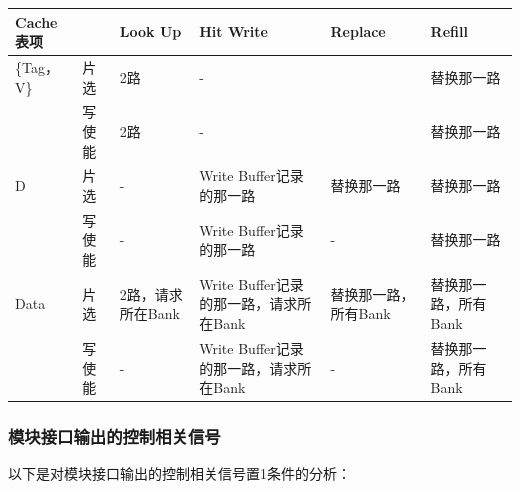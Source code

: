 \begin{longtable}[]{@{}
  >{\raggedright\arraybackslash}p{}
  >{\raggedright\arraybackslash}p{}
  >{\raggedright\arraybackslash}p{}
  >{\raggedright\arraybackslash}p{}
  >{\raggedright\arraybackslash}p{}
  >{\raggedright\arraybackslash}p{}@{}}
\toprule\noalign{}
\begin{minipage}[b]{\linewidth}\raggedright
Cache表项
\end{minipage} & \begin{minipage}[b]{\linewidth}\raggedright
\end{minipage} & \begin{minipage}[b]{\linewidth}\raggedright
Look Up
\end{minipage} & \begin{minipage}[b]{\linewidth}\raggedright
Hit Write
\end{minipage} & \begin{minipage}[b]{\linewidth}\raggedright
Replace
\end{minipage} & \begin{minipage}[b]{\linewidth}\raggedright
Refill
\end{minipage} \\
\midrule\noalign{}
\endhead
\bottomrule\noalign{}
\endlastfoot
\{Tag，V\} & 片选 & 2路 & - & & 替换那一路 \\
& 写使能 & 2路 & - & & 替换那一路 \\
D & 片选 & - & Write Buffer记录的那一路 & 替换那一路 & 替换那一路 \\
& 写使能 & - & Write Buffer记录的那一路 & - & 替换那一路 \\
Data & 片选 & 2路，请求所在Bank & Write Buffer记录的那一路，请求所在Bank & 替换那一路，所有Bank & 替换那一路，所有Bank \\
& 写使能 & - & Write Buffer记录的那一路，请求所在Bank & - & 替换那一路，所有Bank \\
\end{longtable}

\subsubsection{模块接口输出的控制相关信号}\label{sec:09-cache-018}

以下是对模块接口输出的控制相关信号置1条件的分析：

